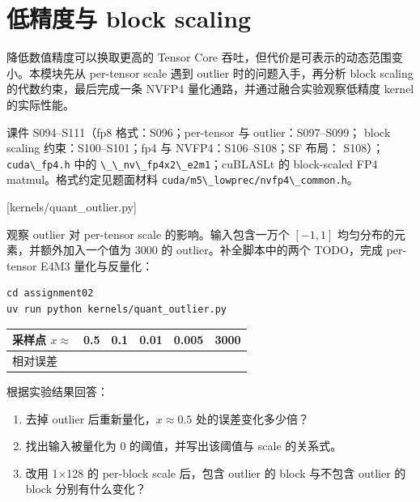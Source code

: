 \documentclass[11pt,a4paper,fontset=none]{ctexart}
\providecommand{\passthrough}[1]{#1}
\begin{document}
\section{低精度与 block
scaling}\label{ux4f4eux7cbeux5ea6ux4e0e-block-scaling}

降低数值精度可以换取更高的 Tensor Core
吞吐，但代价是可表示的动态范围变小。本模块先从 per-tensor scale 遇到
outlier 时的问题入手，再分析 block scaling 的代数约束，最后完成一条
NVFP4 量化通路，并通过融合实验观察低精度 kernel 的实际性能。

\begin{reading}

课件 S094--S111（fp8 格式：S096；per-tensor 与 outlier：S097--S099；
block scaling 约束：S100--S101；fp4 与 NVFP4：S106--S108；SF 布局：
S108）；\passthrough{\lstinline!cuda\_fp4.h!} 中的
\passthrough{\lstinline!\_\_nv\_fp4x2\_e2m1!}；cuBLASLt 的 block-scaled
FP4 matmul。格式约定见题面材料
\passthrough{\lstinline!cuda/m5\_lowprec/nvfp4\_common.h!}。

\end{reading}

[kernels/quant\_outlier.py]

观察 outlier 对 per-tensor scale 的影响。输入包含一万个 \([-1,1]\)
均匀分布的元素，并额外加入一个值为 3000 的 outlier。补全脚本中的两个
TODO，完成 per-tensor E4M3 量化与反量化：

\begin{lstlisting}
cd assignment02
uv run python kernels/quant_outlier.py
\end{lstlisting}

{\def\LTcaptype{none} %
\begin{longtable}[]{@{}llllll@{}}
\toprule\noalign{}
采样点 \(x\approx\) & 0.5 & 0.1 & 0.01 & 0.005 & 3000 \\
\midrule\noalign{}
\endhead
\bottomrule\noalign{}
\endlastfoot
相对误差 & & & & & \\
\end{longtable}
}

根据实验结果回答：

\begin{enumerate}
\def\labelenumi{(\alph{enumi})}
\item
  去掉 outlier 后重新量化，\(x\approx0.5\) 处的误差变化多少倍？
\item
  找出输入被量化为 0 的阈值，并写出该阈值与 scale 的关系式。
\item
  改用 1×128 的 per-block scale 后，包含 outlier 的 block 与不包含
  outlier 的 block 分别有什么变化？
\end{enumerate}
\end{document}
